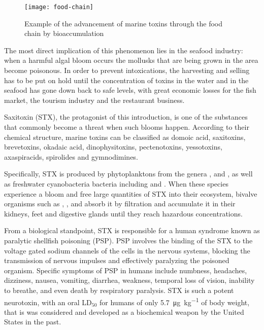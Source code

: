 \begin{figure}
    \centering
    \texttt{[image: food-chain]}
    \caption[Marine toxins through the food chain]{Example of the advancement of marine toxins through the food chain by bioaccumulation}
\end{figure}

The most direct implication of this phenomenon lies in the seafood industry: when a harmful algal bloom occurs the mollusks that are being grown in the area become poisonous.
In order to prevent intoxications, the harvesting and selling has to be put on hold until the concentration of toxins in the water and in the seafood has gone down back to safe levels, with great economic losses for the fish market, the tourism industry and the restaurant business.

Saxitoxin (STX), the protagonist of this introduction, is one of the substances that commonly become a threat when such blooms happen.
According to their chemical structure, marine toxins can be classified as domoic acid, saxitoxins, brevetoxins, okadaic acid, dinophysitoxins, pectenotoxins, yessotoxins, axaspiracids, spirolides and gymnodimines.\cite{gerssen10}

Specifically, STX is produced by phytoplanktons from the genera ,  and ,\cite{gerssen10} as well as freshwater cyanobacteria bacteria including  and .\cite{smith11,tebrineh10,}
When these species experience a bloom and free large quantities of STX into their ecosystem, bivalve organisms such as , ,  and  absorb it by filtration and accumulate it in their kidneys, feet and digestive glands\cite{oikawa05} until they reach hazardous concentrations.

From a biological standpoint, STX is responsible for a human syndrome known as paralytic shellfish poisoning (PSP).
PSP involves the binding of the STX to the voltage gated sodium channels of the cells in the nervous systems, blocking the transmission of nervous impulses and effectively paralyzing the poisoned organism.
Specific symptoms of PSP in humans include numbness, headaches, dizziness, nausea, vomiting, diarrhea, weakness, temporal loss of vision, inability to breathe, and even death by respiratory paralysis.\cite{visciano16,gerssen10}
STX is such a potent neurotoxin, with an oral LD$_{50}$ for humans of only \SI{5.7}{\micro\gram\per\kilo\gram} of body weight,\cite{nguyen20} that is was considered and developed as a biochemical weapon by the United States in the past.\cite{stewart06}

